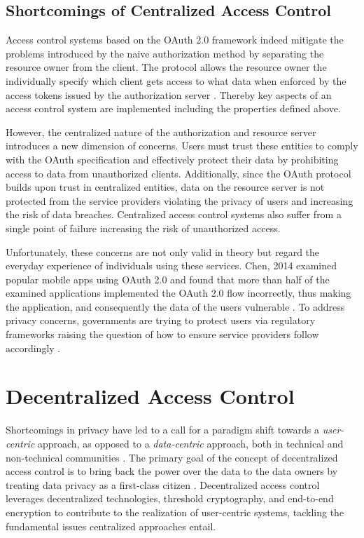 \documentclass[conference]{IEEEtran}
\begin{document}
\subsection{Shortcomings of Centralized Access Control}
\label{sec:shortcomings}
Access control systems based on the OAuth 2.0 framework indeed mitigate the problems introduced by the naive authorization method by separating the resource owner from the client.
The protocol allows the resource owner the individually specify which client gets access to what data when enforced by the access tokens issued by the authorization server \cite{hardt_oauth_2012}.
Thereby key aspects of an access control system are implemented including the properties defined above.

However, the centralized nature of the authorization and resource server introduces a new dimension of concerns.
Users must trust these entities to comply with the OAuth specification and effectively protect their data by prohibiting access to data from unauthorized clients.
Additionally, since the OAuth protocol builds upon trust in centralized entities, data on the resource server is not protected from the service providers violating the privacy of users and increasing the risk of data breaches.
Centralized access control systems also suffer from a single point of failure increasing the risk of unauthorized access.

Unfortunately, these concerns are not only valid in theory but regard the everyday experience of individuals using these services.
Chen, 2014 examined popular mobile apps using OAuth 2.0 and found that more than half of the examined applications implemented the OAuth 2.0 flow incorrectly, thus making the application, and consequently the data of the users vulnerable \cite{chen_oauth_2014}.
To address privacy concerns, governments are trying to protect users via regulatory frameworks raising the question of how to ensure service providers follow accordingly \cite{noauthor_general_nodate}.

\section{Decentralized Access Control}
\label{sec:decentralized_access_control}
Shortcomings in privacy have led to a call for a paradigm shift towards a \textit{user-centric} approach, as opposed to a \textit{data-centric} approach, both in technical and non-technical communities \cite{ernstberger_sok_2023, shafagh_droplet_2020}.
The primary goal of the concept of decentralized access control is to bring back the power over the data to the data owners by treating data privacy as a first-class citizen \cite{ernstberger_sok_2023}.
Decentralized access control leverages decentralized technologies, threshold cryptography, and end-to-end encryption to contribute to the realization of user-centric systems, tackling the fundamental issues centralized approaches entail.
\end{document}
